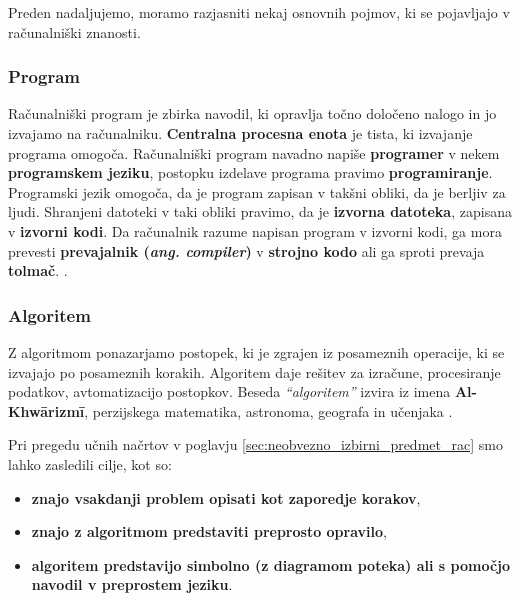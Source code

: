 Preden nadaljujemo, moramo razjasniti nekaj osnovnih pojmov, ki se
pojavljajo v računalniški znanosti.

\subsubsection{Program}
\label{sec:program}

Računalniški program je zbirka navodil, ki opravlja točno določeno
nalogo in jo izvajamo na računalniku. \textbf{Centralna procesna
  enota} je tista, ki izvajanje programa omogoča. Računalniški program
navadno napiše \textbf{programer} v nekem \textbf{programskem jeziku},
postopku izdelave programa pravimo \textbf{programiranje}. Programski
jezik omogoča, da je program zapisan v takšni obliki, da je berljiv za
ljudi. Shranjeni datoteki v taki obliki pravimo, da je \textbf{izvorna
  datoteka}, zapisana v \textbf{izvorni kodi}. Da računalnik razume
napisan program v izvorni kodi, ga mora prevesti \textbf{prevajalnik
  (\emph{ang. compiler})} v \textbf{strojno kodo} ali ga sproti prevaja
\textbf{tolmač}.  \cite{wiki:computer_program}.

\subsubsection{Algoritem}
\label{sec:algoritem}

Z algoritmom ponazarjamo postopek, ki je zgrajen iz posameznih
operacije, ki se izvajajo po posameznih korakih. Algoritem daje rešitev
za izračune, procesiranje podatkov, avtomatizacijo postopkov.
Beseda \emph{``algoritem''} izvira iz imena \textbf{Al-Khwārizmī},
perzijskega matematika, astronoma, geografa in učenjaka \cite{wiki:algorithem}.

Pri pregedu učnih načrtov v poglavju
\ref{sec:neobvezno_izbirni_predmet_rac} smo lahko zasledili cilje, kot
so:

\begin{itemize}
\tightlist
\item \textbf{znajo vsakdanji problem opisati kot zaporedje korakov},
\item \textbf{znajo z algoritmom predstaviti preprosto opravilo},
\item \textbf{algoritem predstavijo simbolno (z diagramom poteka) ali s
  pomočjo navodil v preprostem jeziku}.
\end{itemize}


